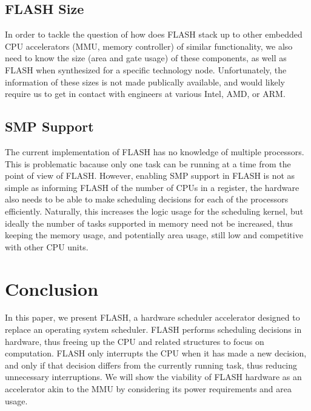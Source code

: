 \documentclass{sig-alternate-10pt}
\begin{document}
\subsection{FLASH Size}
\label{subsec:flash_size}
In order to tackle the question of how does FLASH stack up to other embedded CPU accelerators (MMU, memory controller) of similar functionality, we also need to know the size (area and gate usage) of these components, as well as FLASH when synthesized for a specific technology node. Unfortunately, the information of these sizes is not made publically available, and would likely require us to get in contact with engineers at various Intel, AMD, or ARM.

\subsection{SMP Support}
The current implementation of FLASH has no knowledge of multiple processors. This is problematic bacause only one task can be running at a time from the point of view of FLASH. However, enabling SMP support in FLASH is not as simple as informing FLASH of the number of CPUs in a register, the hardware also needs to be able to make scheduling decisions for each of the processors efficiently. Naturally, this increases the logic usage for the scheduling kernel, but ideally the number of tasks supported in memory need not be increased, thus keeping the memory usage, and potentially area usage, still low and competitive with other CPU units.

\section{Conclusion}
\label{sec:conclusion}
In this paper, we present FLASH, a hardware scheduler accelerator designed to replace an operating system scheduler. FLASH performs scheduling decisions in hardware, thus freeing up the CPU and related structures to focus on computation. FLASH only interrupts the CPU when it has made a new decision, and only if that decision differs from the currently running task, thus reducing unnecessary interruptions. We will show the viability of FLASH hardware as an accelerator akin to the MMU by considering its power requirements and area usage.

\nocite{*}
{
	
	
}
\end{document}
